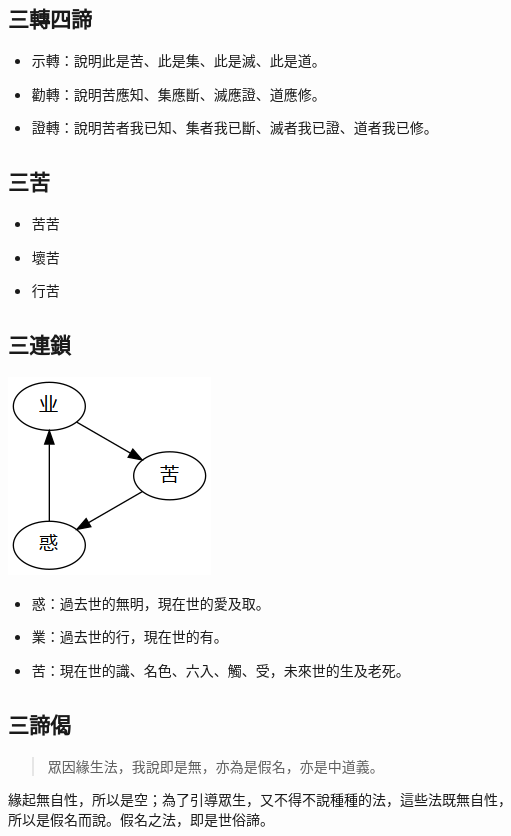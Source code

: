 \subsection{三轉四諦}
\begin{itemize}
  \item 示轉：說明此是苦、此是集、此是滅、此是道。
  \item 勸轉：說明苦應知、集應斷、滅應證、道應修。
  \item 證轉：說明苦者我已知、集者我已斷、滅者我已證、道者我已修。
\end{itemize}

\subsection{三苦}
\begin{itemize}
  \item 苦苦
  \item 壞苦
  \item 行苦
\end{itemize}

\subsection{三連鎖}
\includegraphics[scale=0.5]{释家/images/三连锁.png}
\begin{itemize}
  \item 惑：過去世的無明，現在世的愛及取。
  \item 業：過去世的行，現在世的有。
  \item 苦：現在世的識、名色、六入、觸、受，未來世的生及老死。
\end{itemize}

\subsection{三諦偈}
\begin{quote}
  眾因緣生法，我說即是無，亦為是假名，亦是中道義。
\end{quote}
緣起無自性，所以是空；為了引導眾生，又不得不說種種的法，這些法既無自性，所以是假名而說。假名之法，即是世俗諦。

